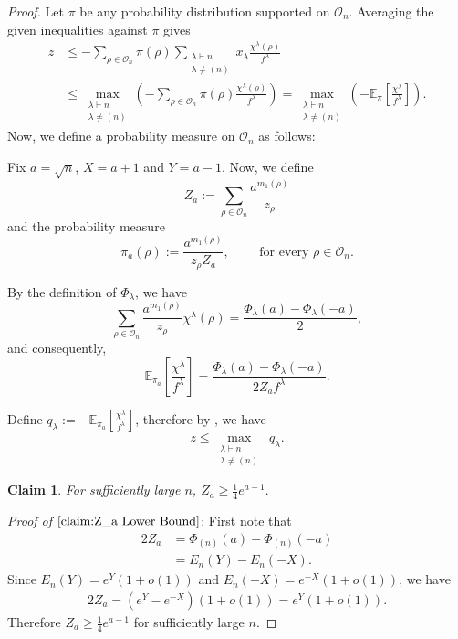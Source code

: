 \documentclass[12pt]{article}
\newtheorem{claim}{Claim}[theorem]
\theoremstyle{definition}
\newcommand{\OO}{\mathcal O}
\newcommand{\E}{\mathbb E}
\newcommand{\1}{\mathbf 1}
\begin{document}
\begin{proof}
    Let \(\pi\) be any probability distribution supported on \(\OO_n\).
Averaging the given inequalities against \(\pi\) gives
\begin{align}
z
&\le
-\sum_{\rho\in\OO_n}\pi(\rho)
\sum_{\substack{\lambda\vdash n\\ \lambda\ne(n)}}
x_\lambda
\frac{\chi^\lambda(\rho)}{f^\lambda}
\nonumber\\
&\le
\max_{\substack{\lambda\vdash n\\ \lambda\ne(n)}}
\left(
-\sum_{\rho\in\OO_n}
\pi(\rho)\frac{\chi^\lambda(\rho)}{f^\lambda}
\right)= \max_{\substack{\lambda\vdash n\\ \lambda\ne(n)}}\left(-\E_{\pi}\left[\frac{\chi^{\lambda}}{f^\lambda}\right]\right).\label{eq:z_upper_exprssn}
\end{align}
Now, we define a probability measure on $\OO_n$ as follows:

Fix $a=\sqrt{n}$, $X=a+1$ and $Y=a-1$. Now, we define 
$$Z_a:=\sum_{\rho\in \OO_n}\frac{a^{m_1(\rho)}}{z_{\rho}}$$
and the probability measure 
$$\pi_{a}(\rho):=\frac{a^{m_1(\rho)}}{z_{\rho}Z_{a}},\qquad \text{ for every  }\rho\in \OO_n.$$


By the definition of $\Phi_\lambda$, we have
$$\sum_{\rho\in\OO_n}
\frac{a^{m_1(\rho)}}{z_\rho}\chi^\lambda(\rho)
=
\frac{\Phi_\lambda(a)-\Phi_\lambda(-a)}{2},$$
and consequently,
\begin{equation}
\label{eq:Fourier-coefficient}
\E_{\pi_a}
\left[
\frac{\chi^\lambda}{f^\lambda}
\right]
=
\frac{\Phi_\lambda(a)-\Phi_\lambda(-a)}
{2Z_af^\lambda}.\nonumber
\end{equation}

Define $q_{\lambda}:=-\E_{\pi_a}
\left[
\frac{\chi^\lambda}{f^\lambda}
\right]$, therefore by , we have 
$$z\leq \max_{\substack{\lambda\vdash n\\ \lambda\ne(n)}}\;q_{\lambda}.$$

\begin{claim}\label{claim:Z_a Lower Bound}
    For sufficiently large $n$, $Z_a\geq \frac{1}{4}e^{a-1}.$
\end{claim}
\textit{Proof of $\cref{claim:Z_a Lower Bound}$}: 
First note that 
\begin{align*}
    2Z_a&=\Phi_{(n)}(a)-\Phi_{(n)}(-a)\\
        &= E_n(Y)-E_n(-X).
\end{align*}
Since $ E_n(Y)=e^Y(1+o(1))$ and $E_n(-X)=e^{-X}(1+o(1))
$, we have 
\begin{align*}
    2Z_a=(e^Y - e^{-X})(1+o(1))= e^Y(1+o(1)).
\end{align*}
Therefore $Z_a\geq \frac{1}{4}e^{a-1}$ for sufficiently large $n$.



\end{proof}
\end{document}
